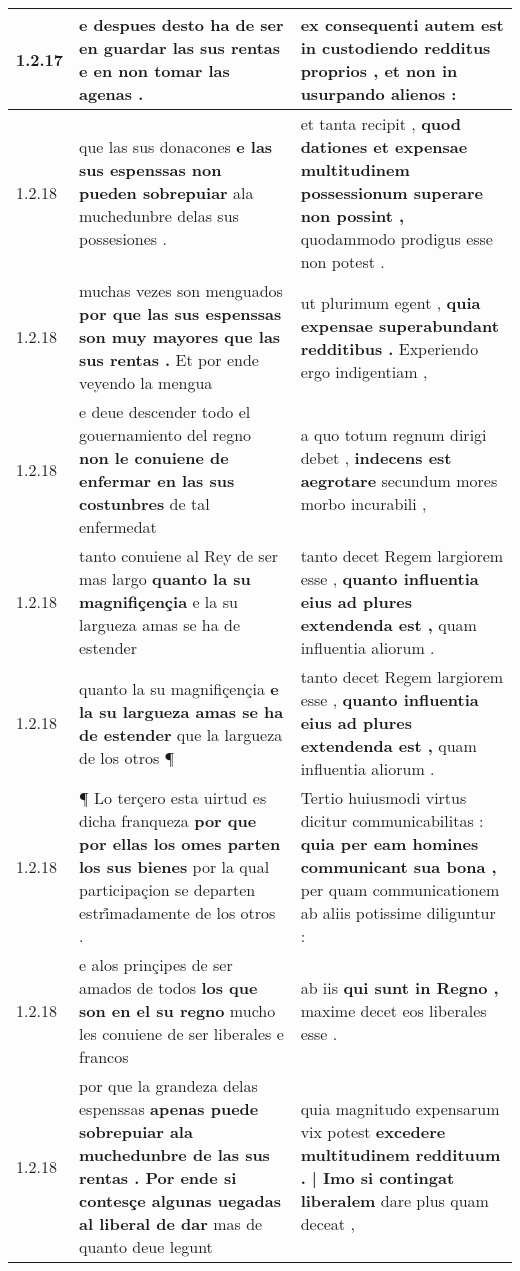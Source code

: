 \begin{tabular}{|p{1cm}|p{6.5cm}|p{6.5cm}|}
1.2.17 & e despues desto ha de ser \textbf{ en guardar las sus rentas } e en non tomar las agenas . & ex consequenti autem est \textbf{ in custodiendo redditus proprios , } et non in usurpando alienos : \\\hline
1.2.18 & que las sus donacones \textbf{ e las sus espenssas non pueden sobrepuiar } ala muchedunbre delas sus possesiones . & et tanta recipit , \textbf{ quod dationes et expensae multitudinem possessionum superare non possint , } quodammodo prodigus esse non potest . \\\hline
1.2.18 & muchas vezes son menguados \textbf{ por que las sus espenssas son muy mayores que las sus rentas . } Et por ende veyendo la mengua & ut plurimum egent , \textbf{ quia expensae superabundant redditibus . } Experiendo ergo indigentiam , \\\hline
1.2.18 & e deue descender todo el gouernamiento del regno \textbf{ non le conuiene de enfermar en las sus costunbres } de tal enfermedat & a quo totum regnum dirigi debet , \textbf{ indecens est aegrotare } secundum mores morbo incurabili , \\\hline
1.2.18 & tanto conuiene al Rey de ser mas largo \textbf{ quanto la su magnifiçençia } e la su largueza amas se ha de estender & tanto decet Regem largiorem esse , \textbf{ quanto influentia eius ad plures extendenda est , } quam influentia aliorum . \\\hline
1.2.18 & quanto la su magnifiçençia \textbf{ e la su largueza amas se ha de estender } que la largueza de los otros ¶ & tanto decet Regem largiorem esse , \textbf{ quanto influentia eius ad plures extendenda est , } quam influentia aliorum . \\\hline
1.2.18 & ¶ Lo terçero esta uirtud es dicha franqueza \textbf{ por que por ellas los omes parten los sus bienes } por la qual participaçion se departen estri̊madamente de los otros . & Tertio huiusmodi virtus dicitur communicabilitas : \textbf{ quia per eam homines communicant sua bona , } per quam communicationem ab aliis potissime diliguntur : \\\hline
1.2.18 & e alos prinçipes de ser amados de todos \textbf{ los que son en el su regno } mucho les conuiene de ser liberales e francos & ab iis \textbf{ qui sunt in Regno , } maxime decet eos liberales esse . \\\hline
1.2.18 & por que la grandeza delas espenssas \textbf{ apenas puede sobrepuiar ala muchedunbre de las sus rentas . Por ende si contesçe algunas uegadas al liberal de dar } mas de quanto deue legunt & quia magnitudo expensarum vix potest \textbf{ excedere multitudinem reddituum . | Imo si contingat liberalem } dare plus quam deceat , \\\hline

\end{tabular}
